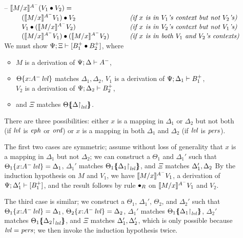\begin{itemize}
\smallskip

\item[--] $\rsubsta{M}{x}{(\tfuser{V_1}{V_2})}{A^-} = $ \smallskip\\
    $\begin{array}{ll}
    \qquad \tfuser{(\rsubsta{M}{x}{V_1}{A^-})}{V_2}
     & \mbox{\it (if $x$ is in $V_1$'s context but not $V_2$'s)}\\
    \qquad \tfuser{V_1}{(\rsubsta{M}{x}{V_2}{A^-})}
     & \mbox{\it (if $x$ is in $V_2$'s context but not $V_1$'s)}\\
    \qquad \tfuser{(\rsubsta{M}{x}{V_1}{A^-})}{(\rsubsta{M}{x}{V_2}{A^-})}
     \qquad & \mbox{\it (if $x$ is in both $V_1$ and $V_2$'s contexts)}
    \end{array}$\smallskip\\
  We must show $\foc{\Psi}{\Xi}{[B_1^+ \fuse B_2^+]}$, where 
  \begin{itemize}
  \item $M$ is a derivation of $\foc{\Psi}{\Delta}{A^-}$, 
  \item $\tackon{\Theta}{x{:}\islvl{A^-}}$ matches $\Delta_1, \Delta_2$,
     $V_1$ is a derivation of $\foc{\Psi}{\Delta_1}{B_1^+}$, \\
     $V_2$ is a derivation of $\foc{\Psi}{\Delta_2}{B_2^+}$, 
  \item and $\Xi$ matches $\frameoff{\Theta}{\restrictto{\Delta}{\mlvl}}$.
  \end{itemize}
  There are three possibilities: either $x$ is a mapping in $\Delta_1$
  or $\Delta_2$ but not both (if $\mlvl$ is $\meph$ or $\mtrue$) 
  or $x$ is a mapping in both $\Delta_1$ and $\Delta_2$ (if $\mlvl$ 
  is $\mpers$). 

  The first two cases are symmetric; 
  assume without loss of generality that $x$ is a mapping
  in $\Delta_1$ but not $\Delta_2$; we can construct a 
  $\Theta_1$ and $\Delta_1'$ 
  such that $\tackon{\Theta_1}{x{:}\islvl{A^-}} = \Delta_1$,
  $\Delta_1'$ matches $\frameoff{\Theta_1}{\restrictto{\Delta_1}{\mlvl}}$,
  and $\Xi$ matches $\matchconj{\Delta_1'}{\Delta_2}$
  By the induction hypothesis on $M$ and $V_1$, we have 
  $\rsubsta{M}{x}{V_1}{A^-}$, a derivation of 
  $\foc{\Psi}{\Delta_1'}{[B_1^+]}$, and the result follows by
  rule ${\fuse}_R$ on $\rsubsta{M}{x}{V_1}{A^-}$ and $V_2$.

  The third case is similar; we construct a 
  $\Theta_1$, $\Delta_1'$, $\Theta_2$, and $\Delta_2'$ such that 
  $\tackon{\Theta_1}{x{:}\islvl{A^-}} = \Delta_1$,
  $\tackon{\Theta_2}{x{:}\islvl{A^-}} = \Delta_2$,
  $\Delta_1'$ matches $\frameoff{\Theta_1}{\restrictto{\Delta_1}{\mlvl}}$,
  $\Delta_2'$ matches $\frameoff{\Theta_1}{\restrictto{\Delta_2}{\mlvl}}$,
  and $\Xi$ matches $\matchconj{\Delta_1'}{\Delta_2'}$, which is only 
  possible because $\mlvl = \mpers$; we then invoke the induction 
  hypothesis twice. 


\end{itemize}
